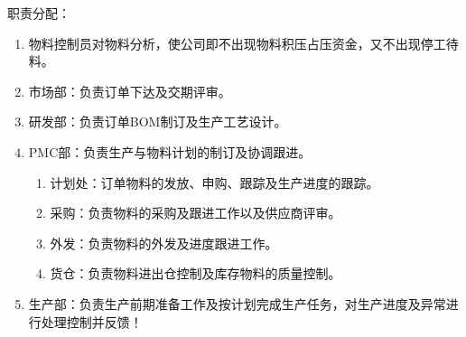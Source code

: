     职责分配：
        \begin{enumerate}
            \item  物料控制员对物料分析，使公司即不出现物料积压占压资金，又不出现停工待料。
            \item  市场部：负责订单下达及交期评审。
            \item  研发部：负责订单BOM制订及生产工艺设计。
            \item  PMC部：负责生产与物料计划的制订及协调跟进。
                \begin{enumerate}
                    \item  计划处：订单物料的发放、申购、跟踪及生产进度的跟踪。
                    \item  采购：负责物料的采购及跟进工作以及供应商评审。
                    \item  外发：负责物料的外发及进度跟进工作。
                    \item  货仓：负责物料进出仓控制及库存物料的质量控制。
                \end{enumerate}
            \item  生产部：负责生产前期准备工作及按计划完成生产任务，对生产进度及异常进行处理控制并反馈！
        \end{enumerate}

